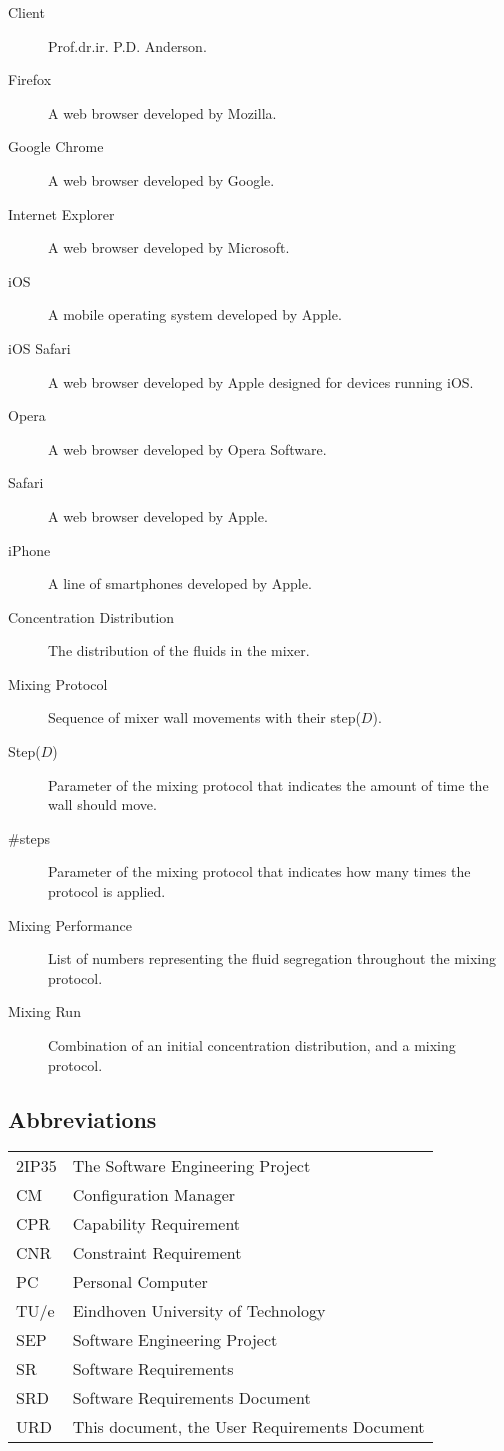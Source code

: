 \begin{description}
\item[Client] Prof.dr.ir. P.D. Anderson.
\item[Firefox] A web browser developed by Mozilla.
\item[Google Chrome] A web browser developed by Google.
\item[Internet Explorer] A web browser developed by Microsoft.
\item[iOS] A mobile operating system developed by Apple.
\item[iOS Safari] A web browser developed by Apple designed for devices running iOS.
\item[Opera] A web browser developed by Opera Software.
\item[Safari] A web browser developed by Apple.
\item[iPhone] A line of smartphones developed by Apple.
\item[Concentration Distribution] The distribution of the fluids in the mixer.
\item[Mixing Protocol] Sequence of mixer wall movements with their step($D$).
\item[Step($D$)] Parameter of the mixing protocol that indicates the amount of time the wall should move.
\item[\#steps] Parameter of the mixing protocol that indicates how many times the protocol is applied.
\item[Mixing Performance] List of numbers representing the fluid segregation throughout the mixing protocol.
\item[Mixing Run] Combination of an initial concentration distribution, and a mixing protocol.
\end{description}

\subsection{Abbreviations}
\begin{tabular}{l|l}
2IP35 & The Software Engineering Project \\
CM    &Configuration Manager \\
CPR & Capability Requirement \\
CNR & Constraint Requirement \\
PC & Personal Computer \\
TU/e  &Eindhoven University of Technology \\
SEP   &Software Engineering Project \\
SR    &Software Requirements \\
SRD   &Software Requirements Document \\
URD & This document, the User Requirements Document \\
\end{tabular}

